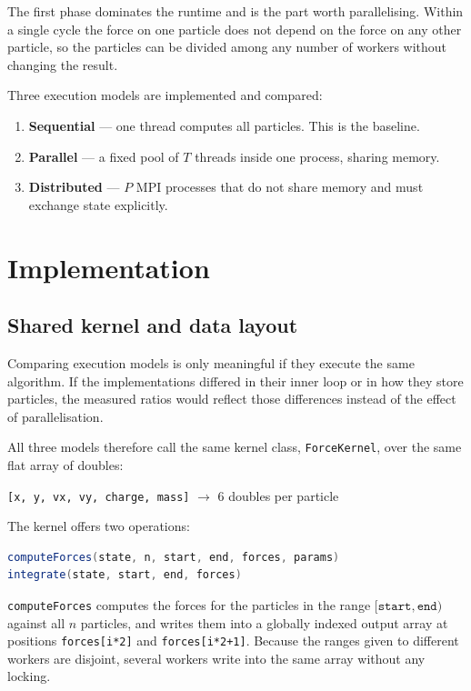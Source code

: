 \documentclass[sigconf]{acmart}
\begin{document}
The first phase dominates the runtime and is the part worth parallelising. Within a single cycle the
force on one particle does not depend on the force on any other particle, so the particles can be
divided among any number of workers without changing the result.

Three execution models are implemented and compared:

\begin{enumerate}
    \item \textbf{Sequential} --- one thread computes all particles. This is the baseline.
    \item \textbf{Parallel} --- a fixed pool of $T$ threads inside one process, sharing memory.
    \item \textbf{Distributed} --- $P$ MPI processes that do not share memory and must exchange
          state explicitly.
\end{enumerate}

\section{Implementation}

\subsection{Shared kernel and data layout}

Comparing execution models is only meaningful if they execute the same algorithm. If the
implementations differed in their inner loop or in how they store particles, the measured ratios
would reflect those differences instead of the effect of parallelisation.

All three models therefore call the same kernel class, \texttt{ForceKernel}, over the same flat array
of doubles:

\begin{center}
\texttt{[x, y, vx, vy, charge, mass]} $\rightarrow$ 6 doubles per particle
\end{center}

The kernel offers two operations:

\begin{lstlisting}[language=Java]
computeForces(state, n, start, end, forces, params)
integrate(state, start, end, forces)
\end{lstlisting}

\texttt{computeForces} computes the forces for the particles in the range $[\texttt{start},
\texttt{end})$ against all $n$ particles, and writes them into a globally indexed output array at
positions \texttt{forces[i*2]} and \texttt{forces[i*2+1]}. Because the ranges given to different
workers are disjoint, several workers write into the same array without any locking.
\end{document}
